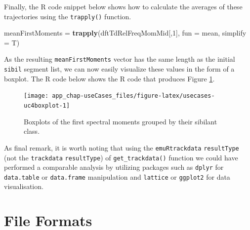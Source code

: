 \documentclass[]{book}
\newenvironment{Shaded}{\begin{snugshade}}{\end{snugshade}}
\newcommand{\DataTypeTok}[1]{\textcolor[rgb]{0.13,0.29,0.53}{#1}}
\newcommand{\DecValTok}[1]{\textcolor[rgb]{0.00,0.00,0.81}{#1}}
\newcommand{\KeywordTok}[1]{\textcolor[rgb]{0.13,0.29,0.53}{\textbf{#1}}}
\newcommand{\NormalTok}[1]{#1}
\newcommand{\OperatorTok}[1]{\textcolor[rgb]{0.81,0.36,0.00}{\textbf{#1}}}
\newcommand{\StringTok}[1]{\textcolor[rgb]{0.31,0.60,0.02}{#1}}
\begin{document}
Finally, the R code snippet below shows how to calculate the averages of these trajectories using the \texttt{trapply()} function.

\begin{Shaded}
\begin{Highlighting}[]
\NormalTok{meanFirstMoments =}\StringTok{ }\KeywordTok{trapply}\NormalTok{(dftTdRelFreqMomMid[,}\DecValTok{1}\NormalTok{],}
                           \DataTypeTok{fun =}\NormalTok{ mean,}
                           \DataTypeTok{simplify =}\NormalTok{ T)}
\end{Highlighting}
\end{Shaded}

As the resulting \texttt{meanFirstMoments} vector has the same length as the initial \texttt{sibil} segment list, we can now easily visualize these values in the form of a boxplot. The R code below shows the R code that produces Figure \ref{fig:usecases-uc4boxplot}.

\begin{Shaded}
\end{Shaded}

\begin{figure}

{\centering \texttt{[image: app\_chap-useCases\_files/figure-latex/usecases-uc4boxplot-1]} 

}

\caption{Boxplots of the first spectral moments grouped by their sibilant class.}\label{fig:usecases-uc4boxplot}
\end{figure}

As final remark, it is worth noting that using the \texttt{emuRtrackdata} \texttt{resultType} (not the \texttt{trackdata} \texttt{resultType}) of \texttt{get\_trackdata()} function we could have performed a comparable analysis by utilizing packages such as \texttt{dplyr} for \texttt{data.table} or \texttt{data.frame} manipulation and \texttt{lattice} or \texttt{ggplot2} for data visualisation.

\hypertarget{app-chap:fileFormats}{%
\chapter{File Formats}\label{app-chap:fileFormats}}
\end{document}
